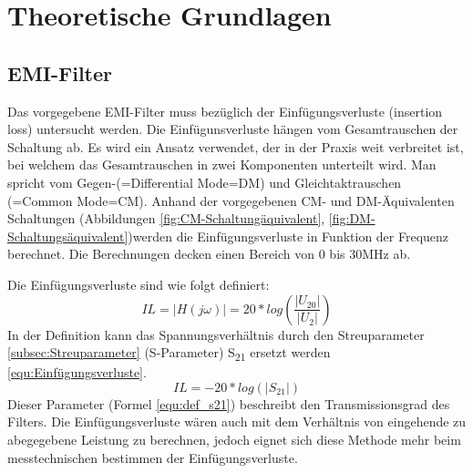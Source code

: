 \section{Theoretische Grundlagen} \label{sec:TheoretischeGrundlagen}

\subsection{EMI-Filter} \label{subsec:emifilter}
Das vorgegebene EMI-Filter muss bezüglich der Einfügungsverluste (insertion loss) untersucht werden. Die Einfügunsverluste hängen vom Gesamtrauschen der Schaltung ab. Es wird ein Ansatz verwendet, der in der Praxis weit verbreitet ist, bei welchem das Gesamtrauschen in zwei Komponenten unterteilt wird. Man spricht vom Gegen-(=Differential Mode=DM) und Gleichtaktrauschen (=Common Mode=CM). Anhand der vorgegebenen CM- und DM-Äquivalenten Schaltungen (Abbildungen \ref{fig:CM-Schaltungäquivalent}, \ref{fig:DM-Schaltungsäquivalent})werden die Einfügungsverluste in Funktion der Frequenz berechnet. Die Berechnungen decken einen Bereich von 0 bis 30MHz ab. 

Die Einfügungsverluste sind wie folgt definiert: 
\begin{equation}\label{equ:Freqgang}
	IL = \left\lvert H(j\omega) \right\rvert = 20*log(\frac{ \left\lvert U_{20} \right\rvert }{ \left\lvert U_2 \right\rvert })
\end{equation}
In der Definition kann das Spannungsverhältnis durch den Streuparameter \ref{subsec:Streuparameter} (S-Parameter) S\textsubscript{21} ersetzt werden \ref{equ:Einfügungsverluste}.
\begin{equation}\label{equ:Einfügungsverluste}
	IL = -20*log (\left\lvert S_{21} \right\rvert)
\end{equation}
 Dieser Parameter (Formel \ref{equ:def_s21}) beschreibt den Transmissionsgrad des Filters. Die Einfügungsverluste wären auch mit dem Verhältnis von eingehende zu abegegebene Leistung zu berechnen, jedoch eignet sich diese Methode mehr beim messtechnischen bestimmen der Einfügungsverluste. 
\newpage
